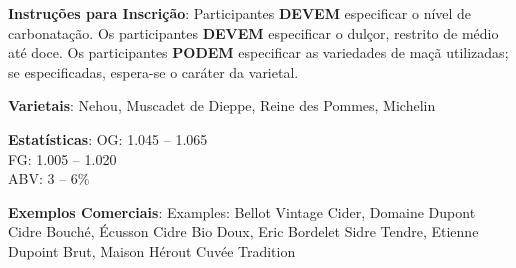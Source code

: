 \textbf{Instruções para Inscrição}: Participantes \textbf{DEVEM} especificar o nível de carbonatação. Os participantes \textbf{DEVEM} especificar o dulçor, restrito de médio até doce. Os participantes \textbf{PODEM} especificar as variedades de maçã utilizadas; se especificadas, espera-se o caráter da varietal.

\textbf{Varietais}: Nehou, Muscadet de Dieppe, Reine des Pommes, Michelin

\textbf{Estatísticas}: OG: 1.045 – 1.065 \\
\phantom{ } \hspace{16.5mm} FG: 1.005 – 1.020 \\
\phantom{ } \hspace{16.5mm} ABV: 3 – 6\%

\textbf{Exemplos Comerciais}: Examples: Bellot Vintage Cider, Domaine Dupont Cidre Bouché, Écusson Cidre Bio Doux, Eric Bordelet Sidre Tendre, Etienne Dupoint Brut, Maison Hérout Cuvée Tradition
